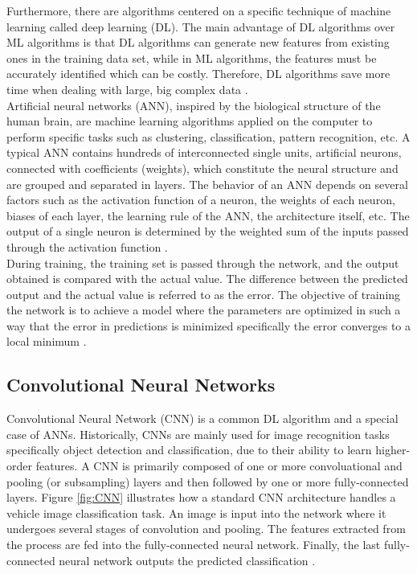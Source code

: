 	Furthermore, there are algorithms centered on a specific technique of machine learning called deep learning (DL). The main advantage of DL algorithms over ML algorithms is that DL algorithms can generate new features from existing ones in the training data set, while in ML algorithms, the features must be accurately identified which can be costly. Therefore, DL algorithms save more time when dealing with large, big complex data \cite{advantageDeepLearning}. \\

	Artificial neural networks (ANN), inspired by the biological structure of the human brain, are machine learning algorithms applied on the computer to perform specific tasks such as clustering, classification, pattern recognition, etc. A typical ANN contains hundreds of interconnected single units, artificial neurons, connected with coefficients (weights), which constitute the neural structure and are grouped and separated in layers. The behavior of an ANN depends on several factors such as the activation function of a neuron, the weights of each neuron, biases of each layer, the learning rule of the ANN, the architecture itself, etc. The output of a single neuron is determined by the weighted sum of the inputs passed through the activation function \cite{artificialNeuralNetworks}. \\

	During training, the training set is passed through the network, and the output obtained is compared with the actual value. The difference between the predicted output and the actual value is referred to as the error. The objective of training the network is to achieve a model where the parameters are optimized in such a way that the error in predictions is minimized specifically the error converges to a local minimum \cite{artificialNeuralNetworks}. \\

\subsection{Convolutional Neural Networks}
\qquad Convolutional Neural Network (CNN) is a common DL algorithm and a special case of ANNs. Historically, CNNs are mainly used for image recognition tasks specifically object detection and classification, due to their ability to learn higher-order features. A CNN is primarily composed of one or more convoluational and pooling (or subsampling) layers and then followed by one or more fully-connected layers. Figure \ref{fig:CNN} illustrates how a standard CNN architecture handles a vehicle image classification task. An image is input into the network where it undergoes several stages of convolution and pooling. The features extracted from the process are fed into the fully-connected neural network. Finally, the last fully-connected neural network outputs the predicted classification \cite{convolutionalNeuralNetworks}.

